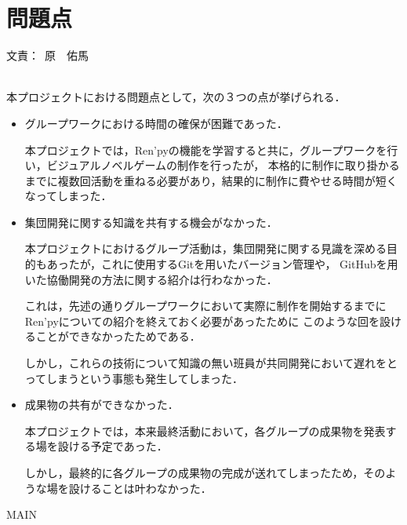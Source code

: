 \documentclass[a4paper]{jarticle}
\newcommand{\resp}[1]{\begin{flushright}文責：~#1\end{flushright}~\\}
\begin{document}
\fi

\section{問題点}
  \resp{原　佑馬}

  本プロジェクトにおける問題点として，次の３つの点が挙げられる．

  \begin{itemize}
    \item グループワークにおける時間の確保が困難であった．
    
      本プロジェクトでは，Ren'pyの機能を学習すると共に，グループワークを行い，ビジュアルノベルゲームの制作を行ったが，
      本格的に制作に取り掛かるまでに複数回活動を重ねる必要があり，結果的に制作に費やせる時間が短くなってしまった．
    
    \item 集団開発に関する知識を共有する機会がなかった．
    
      本プロジェクトにおけるグループ活動は，集団開発に関する見識を深める目的もあったが，これに使用するGitを用いたバージョン管理や，
      GitHubを用いた協働開発の方法に関する紹介は行わなかった．

      これは，先述の通りグループワークにおいて実際に制作を開始するまでにRen'pyについての紹介を終えておく必要があったために
      このような回を設けることができなかったためである．

      しかし，これらの技術について知識の無い班員が共同開発において遅れをとってしまうという事態も発生してしまった．
    
    \item 成果物の共有ができなかった．
    
      本プロジェクトでは，本来最終活動において，各グループの成果物を発表する場を設ける予定であった．

      しかし，最終的に各グループの成果物の完成が送れてしまったため，そのような場を設けることは叶わなかった．
  \end{itemize}

\expandafter\ifx\csname MAIN\endcsname\relax
  
\end{document}
